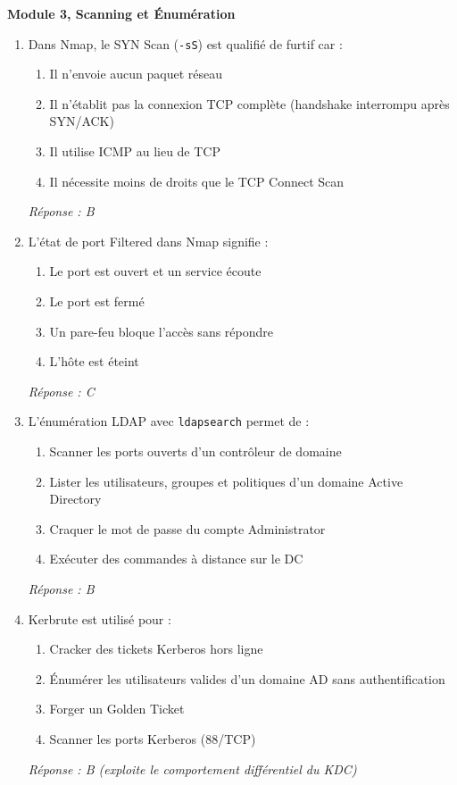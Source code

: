 \medskip
\noindent\textbf{Module 3, Scanning et Énumération}

\begin{enumerate}[resume]

\item Dans Nmap, le SYN Scan (\texttt{-sS}) est qualifié de \og{}furtif\fg{} car :
\begin{enumerate}[label=\Alph*.]
    \item Il n'envoie aucun paquet réseau
    \item Il n'établit pas la connexion TCP complète (handshake interrompu après SYN/ACK)
    \item Il utilise ICMP au lieu de TCP
    \item Il nécessite moins de droits que le TCP Connect Scan
\end{enumerate}
\textit{Réponse : B}

\item L'état de port \og{}Filtered\fg{} dans Nmap signifie :
\begin{enumerate}[label=\Alph*.]
    \item Le port est ouvert et un service écoute
    \item Le port est fermé
    \item Un pare-feu bloque l'accès sans répondre
    \item L'hôte est éteint
\end{enumerate}
\textit{Réponse : C}

\item L'énumération LDAP avec \texttt{ldapsearch} permet de :
\begin{enumerate}[label=\Alph*.]
    \item Scanner les ports ouverts d'un contrôleur de domaine
    \item Lister les utilisateurs, groupes et politiques d'un domaine Active Directory
    \item Craquer le mot de passe du compte Administrator
    \item Exécuter des commandes à distance sur le DC
\end{enumerate}
\textit{Réponse : B}

\item Kerbrute est utilisé pour :
\begin{enumerate}[label=\Alph*.]
    \item Cracker des tickets Kerberos hors ligne
    \item Énumérer les utilisateurs valides d'un domaine AD sans authentification
    \item Forger un Golden Ticket
    \item Scanner les ports Kerberos (88/TCP)
\end{enumerate}
\textit{Réponse : B (exploite le comportement différentiel du KDC)}

\end{enumerate}


